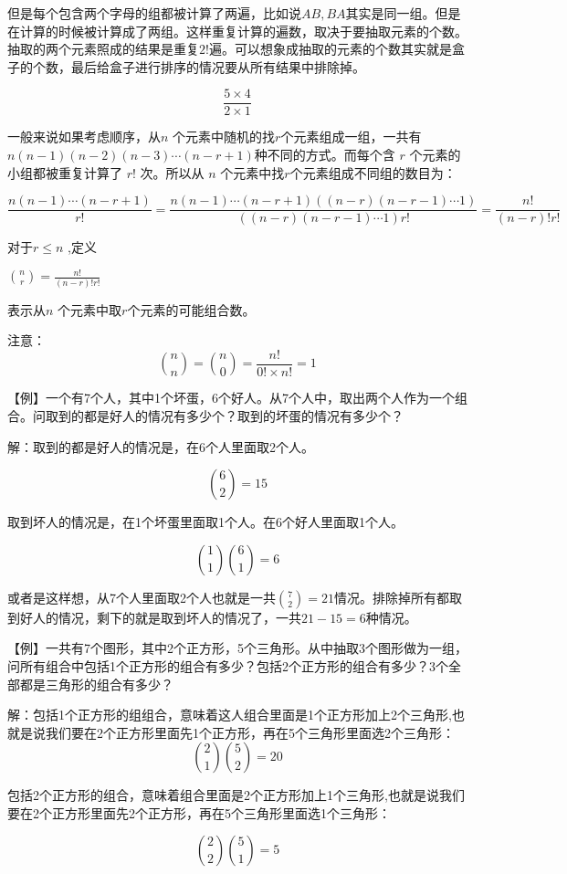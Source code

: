 但是每个包含两个字母的组都被计算了两遍，比如说$AB,BA$其实是同一组。但是在计算的时候被计算成了两组。这样重复计算的遍数，取决于要抽取元素的个数。抽取的两个元素照成的结果是重复$2!$遍。可以想象成抽取的元素的个数其实就是盒子的个数，最后给盒子进行排序的情况要从所有结果中排除掉。

$$
\frac{5 \times 4}{ 2 \times 1}
$$

一般来说如果考虑顺序，从$n$ 个元素中随机的找$r$个元素组成一组，一共有$n(n-1)(n-2)(n-3) \cdots (n-r+1)$种不同的方式。而每个含 $r$ 个元素的小组都被重复计算了 $r!$ 次。所以从 $n$ 个元素中找$r$个元素组成不同组的数目为：

$$
\frac
	{n(n-1) \cdots (n-r+1)}
	{ r! } 
= \frac
	{n(n-1) \cdots (n-r+1) ( (n-r) (n-r-1)\cdots 1) }
	{ ( (n-r) (n-r-1)\cdots 1 ) r! }  
= \frac
	{n!}
	{(n-r)!r!} 
$$

对于$r \leqslant n $ ,定义

	$\displaystyle {n \choose r} = \frac{n!}{(n-r)!r!}$

	表示从$n$ 个元素中取$r$个元素的可能组合数。

注意：
$$
{n \choose n} =  {n \choose 0} = \frac{n!}{0! \times n!} = 1
$$


【例】一个有7个人，其中1个坏蛋，6个好人。从7个人中，取出两个人作为一个组合。问取到的都是好人的情况有多少个？取到的坏蛋的情况有多少个？

解：取到的都是好人的情况是，在6个人里面取2个人。

$$
	{ 6 \choose 2} = 15
$$

取到坏人的情况是，在1个坏蛋里面取1个人。在6个好人里面取1个人。

$$
{1 \choose 1}{ 6 \choose 1} = 6
$$

或者是这样想，从7个人里面取2个人也就是一共$\displaystyle {7 \choose 2} = 21 $情况。排除掉所有都取到好人的情况，剩下的就是取到坏人的情况了，一共$21-15=6$种情况。

【例】一共有7个图形，其中2个正方形，5个三角形。从中抽取3个图形做为一组，问所有组合中包括1个正方形的组合有多少？包括2个正方形的组合有多少？3个全部都是三角形的组合有多少？

解：包括1个正方形的组组合，意味着这人组合里面是1个正方形加上2个三角形,也就是说我们要在2个正方形里面先1个正方形，再在5个三角形里面选2个三角形：
$$
	{2 \choose 1}{5 \choose 2} = 20
$$

包括2个正方形的组合，意味着组合里面是2个正方形加上1个三角形,也就是说我们要在2个正方形里面先2个正方形，再在5个三角形里面选1个三角形：

$$
	{2 \choose 2}{5 \choose 1} = 5
$$

